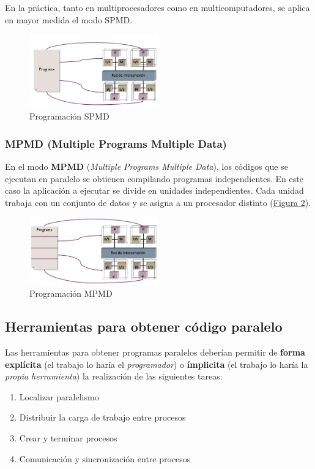 \documentclass[10pt,a4paper,spanish]{report}
\begin{document}
En la práctica, tanto en multiprocesadores como en multicomputadores, se aplica en mayor medida el modo SPMD.

\begin{figure}[!h]
\centering
\includegraphics[width=0.5\textwidth]{24}
\caption{Programación SPMD}
\label{prog_spmd}
\end{figure}


\textcolor[rgb]{0.2,0.4,0.8}{\subsubsection{MPMD (Multiple Programs Multiple Data)}}
En el modo \textcolor[rgb]{0.2,0.4,0.8}{\textbf{MPMD}} (\textcolor[rgb]{0.2,0.4,0.8}{\textit{Multiple Programs Multiple Data}}), los códigos que se ejecutan en paralelo se obtienen compilando programas independientes. En este caso la aplicación a ejecutar se divide en unidades independientes. Cada unidad trabaja con un conjunto de datos y se asigna a un procesador distinto (\hyperref[prog_mpmd]{Figura \ref*{prog_mpmd}}).

\begin{figure}[!h]
\centering
\includegraphics[width=0.5\textwidth]{25}
\caption{Programación MPMD}
\label{prog_mpmd}
\end{figure}

\newpage
\textcolor[rgb]{0.2,0.4,0.8}{\subsection{Herramientas para obtener código paralelo}}
Las herramientas para obtener programas paralelos deberían permitir de \textbf{\textcolor[rgb]{0.2,0.4,0.8}{forma explícita}} (el trabajo lo haría el \textcolor[rgb]{0.2,0.4,0.8}{\textit{programador}}) o \textcolor[rgb]{0.2,0.4,0.8}{\textbf{ímplicita}} (el trabajo lo haría la \textit{\textcolor[rgb]{0.2,0.4,0.8}{propia herramienta}}) la realización de las siguientes tareas:
\begin{enumerate}[\color{azul}{\bf $\heartsuit$}]
    \item Localizar paralelismo
    \item Distribuir la carga de trabajo entre procesos
    \item Crear y terminar procesos
    \item Comunicación y sincronización entre procesos
\end{enumerate}
\end{document}
